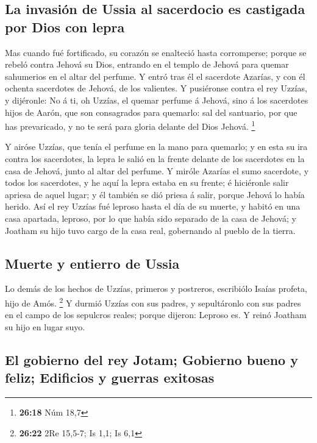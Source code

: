 \hypertarget{la-invasiuxf3n-de-ussia-al-sacerdocio-es-castigada-por-dios-con-lepra}{%
\subsection{La invasión de Ussia al sacerdocio es castigada por Dios con
lepra}\label{la-invasiuxf3n-de-ussia-al-sacerdocio-es-castigada-por-dios-con-lepra}}

 Mas cuando fué fortificado, su corazón se enalteció hasta
corromperse; porque se rebeló contra Jehová su Dios, entrando en el
templo de Jehová para quemar sahumerios en el altar del perfume.
 Y entró tras él el sacerdote Azarías, y con él ochenta
sacerdotes de Jehová, de los valientes.  Y pusiéronse
contra el rey Uzzías, y dijéronle: No á ti, oh Uzzías, el quemar perfume
á Jehová, sino á los sacerdotes hijos de Aarón, que son consagrados para
quemarlo: sal del santuario, por que has prevaricado, y no te será para
gloria delante del Dios Jehová. \footnote{\textbf{26:18} Núm 18,7}

 Y airóse Uzzías, que tenía el perfume en la mano para
quemarlo; y en esta su ira contra los sacerdotes, la lepra le salió en
la frente delante de los sacerdotes en la casa de Jehová, junto al altar
del perfume.  Y miróle Azarías el sumo sacerdote, y todos
los sacerdotes, y he aquí la lepra estaba en su frente; é hiciéronle
salir apriesa de aquel lugar; y él también se dió priesa á salir, porque
Jehová lo había herido.  Así el rey Uzzías fué leproso
hasta el día de su muerte, y habitó en una casa apartada, leproso, por
lo que había sido separado de la casa de Jehová; y Joatham su hijo tuvo
cargo de la casa real, gobernando al pueblo de la tierra.

\hypertarget{muerte-y-entierro-de-ussia}{%
\subsection{Muerte y entierro de
Ussia}\label{muerte-y-entierro-de-ussia}}

 Lo demás de los hechos de Uzzías, primeros y postreros,
escribiólo Isaías profeta, hijo de Amós. \footnote{\textbf{26:22} 2Re
  15,5-7; Is 1,1; Is 6,1}  Y durmió Uzzías con sus padres,
y sepultáronlo con sus padres en el campo de los sepulcros reales;
porque dijeron: Leproso es. Y reinó Joatham su hijo en lugar suyo.

\hypertarget{el-gobierno-del-rey-jotam-gobierno-bueno-y-feliz-edificios-y-guerras-exitosas}{%
\subsection{El gobierno del rey Jotam; Gobierno bueno y feliz; Edificios
y guerras
exitosas}\label{el-gobierno-del-rey-jotam-gobierno-bueno-y-feliz-edificios-y-guerras-exitosas}}


